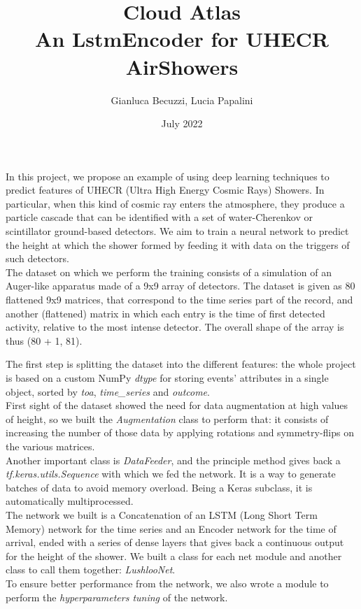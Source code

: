 \documentclass{article}
\title{Cloud Atlas \\[1ex] \large An LstmEncoder for UHECR AirShowers}
\author{Gianluca Becuzzi, Lucia Papalini}
\date{July 2022}
\begin{document}
\maketitle

In this project, we propose an example of using deep learning techniques to predict features of UHECR 
(Ultra High Energy Cosmic Rays) Showers.
In particular, when this kind of cosmic ray enters the atmosphere, they produce a particle cascade 
that can be identified with a set of water-Cherenkov or scintillator ground-based detectors. We aim to train a neural network to predict the height at which the shower formed by feeding it with data on the triggers of such detectors.\\
The dataset on which we perform the training consists of a simulation of an Auger-like apparatus 
made of a 9x9 array of detectors. The dataset is given as 80 flattened 9x9 matrices, that correspond to the time series part of the record, and another (flattened) matrix
in which each entry is the time of first detected activity, relative to the most intense detector.
The overall shape of the array is thus (80 + 1, 81).

The first step is splitting the dataset into the different features: the whole project is based on a custom NumPy \textit{dtype} for storing events' attributes in a single object, sorted by \textit{toa}, \textit{time\_series} and \textit{outcome}.\\
First sight of the dataset showed the need for data augmentation at high values of height, so we built the \textit{Augmentation} class to perform that: it consists of increasing the number of those data by applying rotations and symmetry-flips on the various matrices.\\
Another important class is \textit{DataFeeder}, and the principle method gives back a \textit{tf.keras.utils.Sequence} 
with which we fed the network. It is a way to generate batches of data to avoid memory overload. Being a Keras subclass, it is automatically multiprocessed.\\
The network we built is a Concatenation of an LSTM (Long Short Term Memory) network for the time series and an Encoder network for the time of arrival, ended with a series of dense layers that gives back a continuous output for the height of the shower. We built a class for each net module and another class to call them together: \textit{LushlooNet}.\\
To ensure better performance from the network, we also wrote a module to perform the \textit{hyperparameters tuning} of the network.
\end{document}
